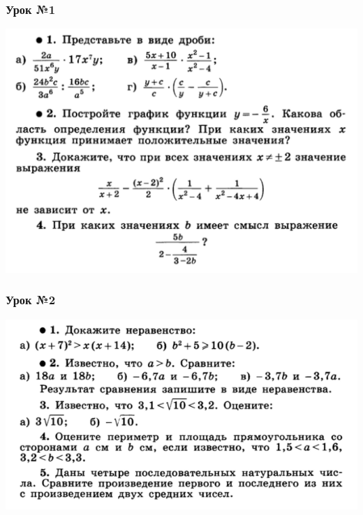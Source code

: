 \documentclass[algebra,a5paper]{pum}
\date{28.04.20}
\begin{document}
\subsubsection*{Урок №1}
\includegraphics[width=\textwidth]{img/17-1.png}

\subsubsection*{Урок №2}
\includegraphics[width=\textwidth]{img/17-2.png}
\end{document}

